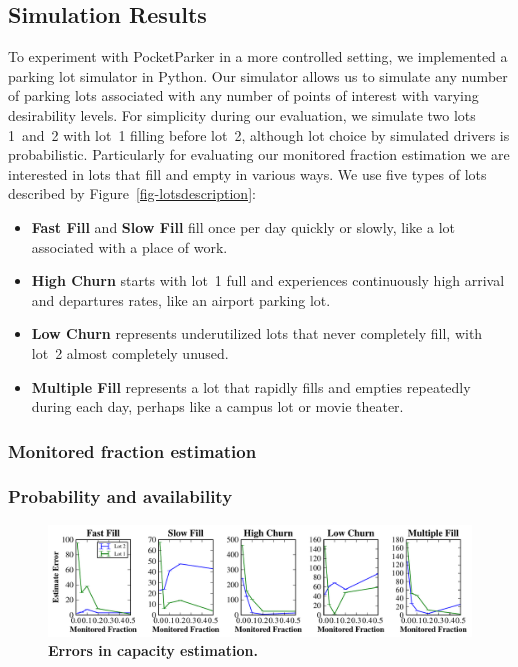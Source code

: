 \subsection{Simulation Results}
\label{subsec-simulator}

To experiment with PocketParker in a more controlled setting, we implemented
a parking lot simulator in Python. Our simulator allows us to simulate any
number of parking lots associated with any number of points of interest with
varying desirability levels. For simplicity during our evaluation, we
simulate two lots 1~and~2 with lot~1 filling before lot~2, although lot
choice by simulated drivers is probabilistic. Particularly for evaluating our
monitored fraction estimation we are interested in lots that fill and empty
in various ways. We use five types of lots described by
Figure~\ref{fig-lotsdescription}:

\begin{itemize}

\item \textbf{Fast Fill} and \textbf{Slow Fill} fill once per day quickly or
slowly, like a lot associated with a place of work.

\item \textbf{High Churn} starts with lot~1 full and experiences continuously
high arrival and departures rates, like an airport parking lot.

\item \textbf{Low Churn} represents underutilized lots that never completely
fill, with lot~2 almost completely unused.

\item \textbf{Multiple Fill} represents a lot that rapidly fills and empties
repeatedly during each day, perhaps like a campus lot or movie theater.

\end{itemize}

\subsubsection{Monitored fraction estimation}

\subsubsection{Probability and availability}

\begin{figure}
\centering
\includegraphics[width=\textwidth]{./simulator/figures/capacity_experiment.pdf}

\caption{\textbf{Errors in capacity estimation.} }

\label{fig-capacityerrors}
\end{figure}

